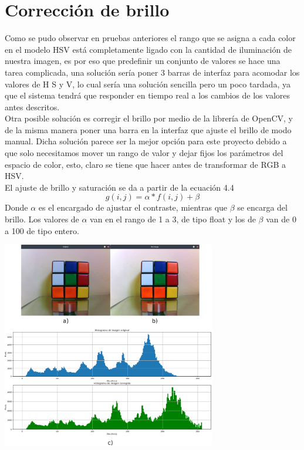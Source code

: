 \section{Corrección de brillo}
Como se pudo observar en pruebas anteriores el rango que se asigna a cada color en el modelo HSV está
completamente ligado con la cantidad de iluminación de nuestra imagen, es por eso que predefinir
un conjunto de valores se hace una tarea complicada, una solución sería poner 3 barras de interfaz
para acomodar los valores de H S y V, lo cual sería una solución sencilla pero un poco tardada, ya que
el sistema tendrá que responder en tiempo real a los cambios de los valores antes descritos.\\
Otra posible solución es corregir el brillo por medio de la librería de OpenCV,
y de la misma manera poner una barra en la interfaz que ajuste el brillo de modo manual. Dicha solución
parece ser la mejor opción para este proyecto debido a que solo necesitamos mover un rango de valor y dejar
fijos los parámetros del espacio de color, esto, claro se tiene que hacer antes de transformar de RGB
a HSV.\\
El ajuste de brillo y saturación se da a partir de la ecuación 4.4
\begin{equation}
	g(i,j) = \alpha * f(i,j) + \beta
\end{equation}
Donde $\alpha$ es el encargado de ajustar el contraste, mientras que $\beta$ se encarga del brillo.
Los valores de $\alpha$ van en el rango de 1 a 3, de tipo float y los de $\beta$ van de 0 a 100 de tipo entero.
\begin{center}
	\includegraphics[width=0.7\textwidth]{Contenido/Cuerpo/Capitulo4/Fig19.eps}
	\label{Fig9}
\end{center}
